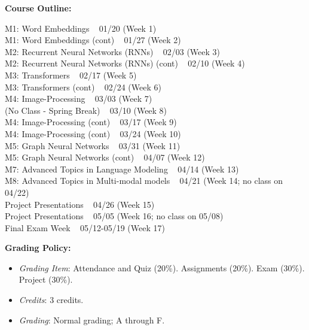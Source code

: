 \documentclass[11pt, a4paper]{article}
\begin{document}
\clearpage

\noindent \textbf{Course Outline:}
\begin{center}
\begin{minipage}{5in}
\begin{flushleft}
M1: Word Embeddings \dotfill ~ 01/20 (Week 1) \\
M1: Word Embeddings (cont) \dotfill ~ 01/27 (Week 2) \\
M2: Recurrent Neural Networks (RNNs) \dotfill ~ 02/03 (Week 3) \\
M2: Recurrent Neural Networks (RNNs) (cont) \dotfill ~ 02/10 (Week 4) \\
M3: Transformers \dotfill ~ 02/17 (Week 5) \\
M3: Transformers (cont) \dotfill ~ 02/24 (Week 6) \\
M4: Image-Processing \dotfill ~ 03/03 (Week 7) \\
(No Class - Spring Break) \dotfill ~ 03/10 (Week 8) \\
M4: Image-Processing (cont) \dotfill ~ 03/17 (Week 9) \\
M4: Image-Processing (cont) \dotfill ~ 03/24 (Week 10) \\
M5: Graph Neural Networks \dotfill ~ 03/31 (Week 11) \\
M5: Graph Neural Networks (cont) \dotfill ~ 04/07 (Week 12) \\
M7: Advanced Topics in Language Modeling \dotfill ~ 04/14 (Week 13) \\
M8: Advanced Topics in Multi-modal models \dotfill ~ 04/21 (Week 14; no class on 04/22) \\
Project Presentations \dotfill ~ 04/26 (Week 15) \\
Project Presentations \dotfill ~ 05/05 (Week 16; no class on 05/08) \\
Final Exam Week \dotfill ~ 05/12-05/19 (Week 17) \\
\end{flushleft}
\end{minipage}
\end{center}

\vspace*{.15in}
\noindent\textbf{Grading Policy:}
\begin{itemize}
\item \textit{Grading Item}: Attendance and Quiz (20\%). Assignments (20\%). Exam (30\%). Project (30\%).
\item \textit{Credits}: 3 credits.
\item \textit{Grading}: Normal grading; A through F.
\end{itemize}
\end{document}
